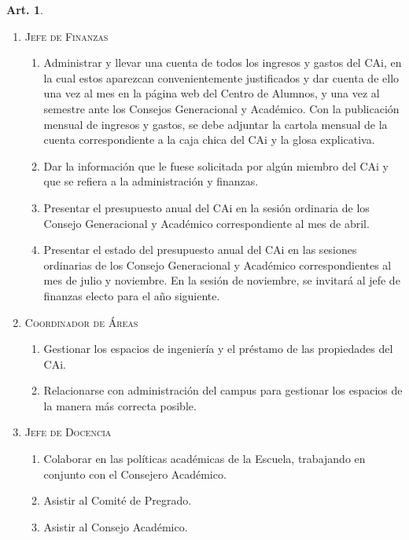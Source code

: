 \documentclass[letterpaper,11pt]{article}
\theoremstyle{definition}%
\newtheorem{art}{Art.} %
\begin{document}
\begin{art}
\begin{enumerate}
		\item \textsc{Jefe de Finanzas}
		      \begin{enumerate}
			      \item Administrar y llevar una cuenta de todos los ingresos y gastos del CAi, en la cual estos aparezcan convenientemente justificados y dar cuenta de ello una vez al mes en la página web del Centro de Alumnos, y una vez al semestre ante los Consejos Generacional y Académico. Con la publicación mensual de ingresos y gastos, se debe adjuntar la cartola mensual de la cuenta correspondiente a la caja chica del CAi y la glosa explicativa.

			      \item Dar la información que le fuese solicitada por algún miembro del CAi y que se refiera a la administración y finanzas.

			      \item Presentar el presupuesto anual del CAi en la sesión ordinaria de los  Consejo Generacional y Académico correspondiente al mes de abril.

			      \item Presentar el estado del presupuesto anual del CAi en las sesiones ordinarias de los Consejo Generacional y Académico correspondientes al mes de julio y noviembre. En la sesión de noviembre, se invitará al jefe de finanzas electo para el año siguiente.
		      \end{enumerate}

		\item \textsc{Coordinador de Áreas}
		      \begin{enumerate}
			      \item Gestionar los espacios de ingeniería y el préstamo de las propiedades del CAi.
			      \item Relacionarse con administración del campus para gestionar los espacios de la manera más correcta posible.
		      \end{enumerate}

		\item \textsc{Jefe de Docencia}
		      \begin{enumerate}
			      \item Colaborar en las políticas académicas de la Escuela, trabajando en conjunto con el Consejero Académico.

			      \item Asistir al Comité de Pregrado.

			      \item Asistir al Consejo Académico.
		      \end{enumerate}


\end{enumerate}
\end{art}
\end{document}
